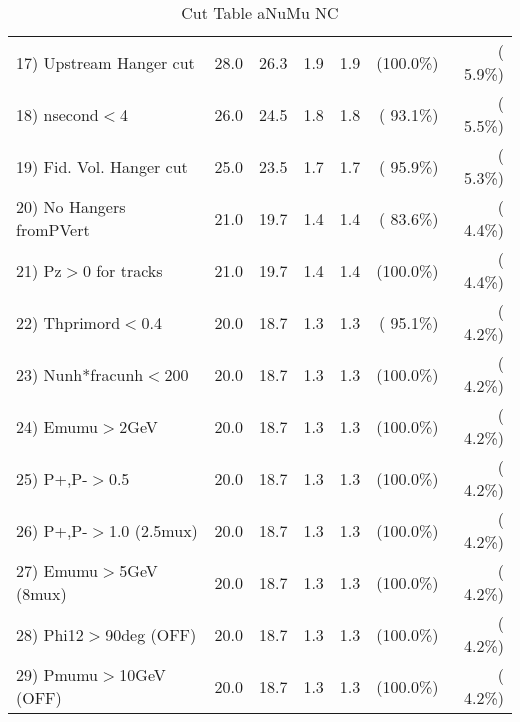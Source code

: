 \begin{table}[h!]
\begin{tabular}{||l||r|r|r|r|r|r||}
 17) Upstream Hanger cut  &         28.0 &         26.3 &          1.9 &          1.9 & (100.0\%) & (  5.9\%) \\
 18) nsecond$<$4          &         26.0 &         24.5 &          1.8 &          1.8 & ( 93.1\%) & (  5.5\%) \\
 19) Fid. Vol. Hanger cut &         25.0 &         23.5 &          1.7 &          1.7 & ( 95.9\%) & (  5.3\%) \\
 20) No Hangers fromPVert &         21.0 &         19.7 &          1.4 &          1.4 & ( 83.6\%) & (  4.4\%) \\
 21) Pz$>$0 for tracks    &         21.0 &         19.7 &          1.4 &          1.4 & (100.0\%) & (  4.4\%) \\
 22) Thprimord$<$0.4      &         20.0 &         18.7 &          1.3 &          1.3 & ( 95.1\%) & (  4.2\%) \\
 23) Nunh*fracunh$<$200   &         20.0 &         18.7 &          1.3 &          1.3 & (100.0\%) & (  4.2\%) \\
 24) Emumu$>$2GeV         &         20.0 &         18.7 &          1.3 &          1.3 & (100.0\%) & (  4.2\%) \\
 25) P+,P-$>$0.5          &         20.0 &         18.7 &          1.3 &          1.3 & (100.0\%) & (  4.2\%) \\
 26) P+,P-$>$1.0 (2.5mux) &         20.0 &         18.7 &          1.3 &          1.3 & (100.0\%) & (  4.2\%) \\
 27) Emumu$>$5GeV  (8mux) &         20.0 &         18.7 &          1.3 &          1.3 & (100.0\%) & (  4.2\%) \\
 28) Phi12$>$90deg  (OFF) &         20.0 &         18.7 &          1.3 &          1.3 & (100.0\%) & (  4.2\%) \\
 29) Pmumu$>$10GeV  (OFF) &         20.0 &         18.7 &          1.3 &          1.3 & (100.0\%) & (  4.2\%) \\
 \hline
 \hline
 \end{tabular}
 \caption{Cut Table  aNuMu NC }
 \label{tab-cutcohjpsi-mumu_anumunc}
 \end{table}
